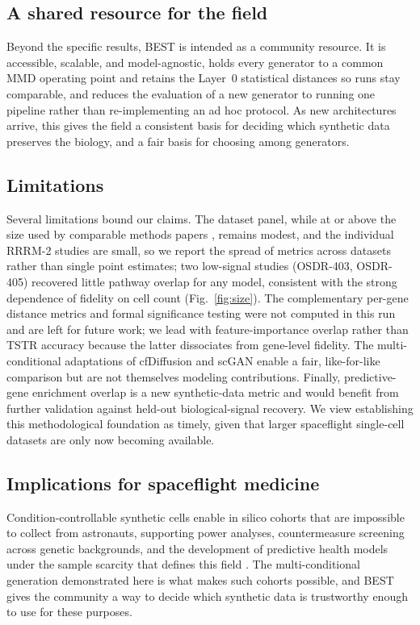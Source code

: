 \documentclass[11pt]{article}
\newcommand{\fides}{BEST}
\begin{document}
\subsection{A shared resource for the field}
Beyond the specific results, \fides{} is intended as a community resource. It is accessible, scalable, and model-agnostic, holds every generator to a common MMD operating point and retains the Layer~0 statistical distances so runs stay comparable, and reduces the evaluation of a new generator to running one pipeline rather than re-implementing an ad hoc protocol. As new architectures arrive, this gives the field a consistent basis for deciding which synthetic data preserves the biology, and a fair basis for choosing among generators.

\subsection{Limitations}
Several limitations bound our claims. The dataset panel, while at or above the size used by comparable methods papers \cite{cfgen,scdiffusion,cfdiffusion}, remains modest, and the individual RRRM-2 studies are small, so we report the spread of metrics across datasets rather than single point estimates; two low-signal studies (OSDR-403, OSDR-405) recovered little pathway overlap for any model, consistent with the strong dependence of fidelity on cell count (Fig.~\ref{fig:size}). The complementary per-gene distance metrics and formal significance testing were not computed in this run and are left for future work; we lead with feature-importance overlap rather than TSTR accuracy because the latter dissociates from gene-level fidelity. The multi-conditional adaptations of cfDiffusion and scGAN enable a fair, like-for-like comparison but are not themselves modeling contributions. Finally, predictive-gene enrichment overlap is a new synthetic-data metric and would benefit from further validation against held-out biological-signal recovery. We view establishing this methodological foundation as timely, given that larger spaceflight single-cell datasets are only now becoming available.

\subsection{Implications for spaceflight medicine}
Condition-controllable synthetic cells enable in silico cohorts that are impossible to collect from astronauts, supporting power analyses, countermeasure screening across genetic backgrounds, and the development of predictive health models under the sample scarcity that defines this field \cite{scott,ilangovan}. The multi-conditional generation demonstrated here is what makes such cohorts possible, and \fides{} gives the community a way to decide which synthetic data is trustworthy enough to use for these purposes.
\end{document}
